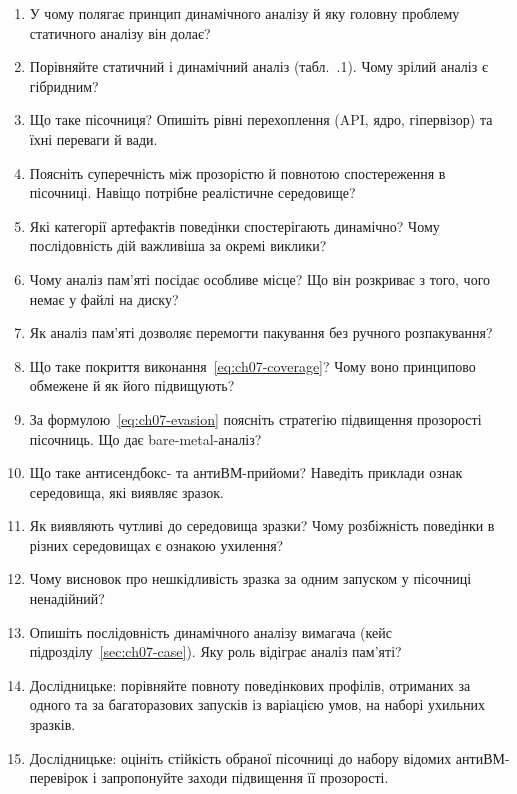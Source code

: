 \selfcheck
\begin{enumerate}
\item У чому полягає принцип динамічного аналізу й яку головну проблему статичного аналізу він долає?
\item Порівняйте статичний і динамічний аналіз (табл.~\thechapter.1). Чому зрілий аналіз є гібридним?
\item Що таке пісочниця? Опишіть рівні перехоплення (API, ядро, гіпервізор) та їхні переваги й вади.
\item Поясніть суперечність між прозорістю й повнотою спостереження в пісочниці. Навіщо потрібне реалістичне середовище?
\item Які категорії артефактів поведінки спостерігають динамічно? Чому послідовність дій важливіша за окремі виклики?
\item Чому аналіз пам'яті посідає особливе місце? Що він розкриває з того, чого немає у файлі на диску?
\item Як аналіз пам'яті дозволяє перемогти пакування без ручного розпакування?
\item Що таке покриття виконання~\eqref{eq:ch07-coverage}? Чому воно принципово обмежене й як його підвищують?
\item За формулою~\eqref{eq:ch07-evasion} поясніть стратегію підвищення прозорості пісочниць. Що дає bare-metal-аналіз?
\item Що таке антисендбокс- та антиВМ-прийоми? Наведіть приклади ознак середовища, які виявляє зразок.
\item Як виявляють чутливі до середовища зразки? Чому розбіжність поведінки в різних середовищах є ознакою ухилення?
\item Чому висновок про нешкідливість зразка за одним запуском у пісочниці ненадійний?
\item Опишіть послідовність динамічного аналізу вимагача (кейс підрозділу~\ref{sec:ch07-case}). Яку роль відіграє аналіз пам'яті?
\item Дослідницьке: порівняйте повноту поведінкових профілів, отриманих за одного та за багаторазових запусків із варіацією умов, на наборі ухильних зразків.
\item Дослідницьке: оцініть стійкість обраної пісочниці до набору відомих антиВМ-перевірок і запропонуйте заходи підвищення її прозорості.
\end{enumerate}
